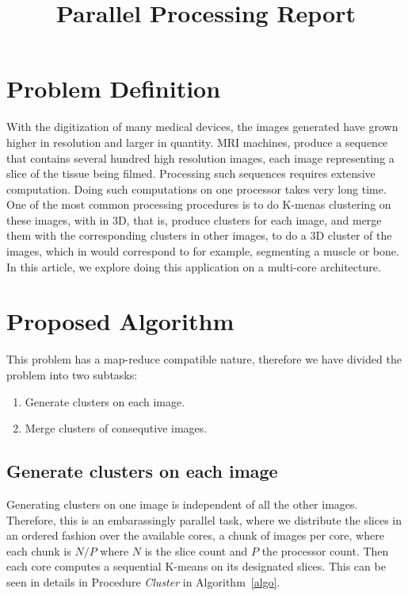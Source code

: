 \documentclass{article}
\begin{document}
	\title{Parallel Processing Report}
	\maketitle
	\section{Problem Definition}
		With the digitization of many medical devices, the images generated have grown higher in resolution and larger in quantity. MRI machines, produce a sequence that contains several hundred high resolution images, each image representing a slice of the tissue being filmed. Processing such sequences requires extensive computation. Doing such computations on one processor takes very long time. One of the most common processing procedures is to do K-menas clustering on these images, with in 3D, that is, produce clusters for each image, and merge them with the corresponding clusters in other images, to do a 3D cluster of the images, which in would correspond to for example, segmenting a muscle or bone. In this article, we explore doing this application on a multi-core architecture.
	\section{Proposed Algorithm}\label{sec:alg}
		This problem has a map-reduce compatible nature, therefore we have divided the problem into two subtasks:
		\begin{enumerate}
			\item Generate clusters on each image. \label{task:1}
			\item Merge clusters of consequtive images. \label{task:2}
		\end{enumerate}
		\subsection{Generate clusters on each image}
			Generating clusters on one image is independent of all the other images. Therefore, this is an embarassingly parallel task, where we distribute the slices in an ordered fashion over the available cores, a chunk of images per core, where each chunk is $N/P$ where $N$ is the slice count and $P$ the processor count. Then each core computes a sequential K-means on its designated slices. This can be seen in details in Procedure \textit{Cluster} in Algorithm~\ref{algo}.
\end{document}
